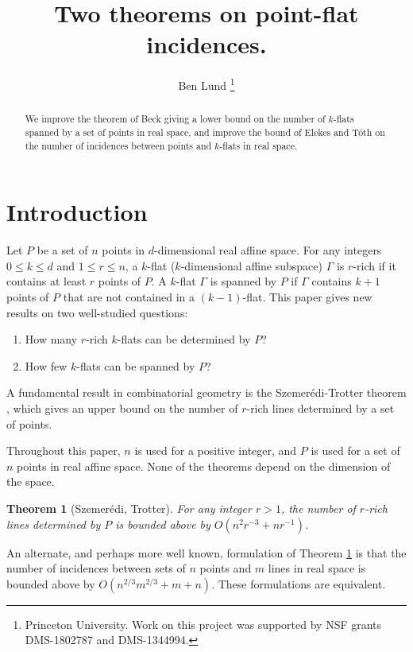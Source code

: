 \documentclass{article}
\newtheorem{theorem}{Theorem}
\begin{document}
\title{Two theorems on point-flat incidences.}
\author{Ben Lund \footnote{Princeton University. Work on this project was supported by NSF grants DMS-1802787 and DMS-1344994.}}

\maketitle

\begin{abstract}
We improve the theorem of Beck giving a lower bound on the number of $k$-flats spanned by a set of points in real space, and improve the bound of Elekes and T\'oth on the number of incidences between points and $k$-flats in real space.
\end{abstract}

\section{Introduction}

Let $P$ be a set of $n$ points in $d$-dimensional real affine space.
For any integers $0 \leq k \leq d$ and $1 \leq r \leq n$, a $k$-flat ($k$-dimensional affine subspace) $\Gamma$ is $r$-rich if it contains at least $r$ points of $P$.
A $k$-flat $\Gamma$ is spanned by $P$ if $\Gamma$ contains $k+1$ points of $P$ that are not contained in a $(k-1)$-flat.
This paper gives new results on two well-studied questions:
\begin{enumerate}
\item How many $r$-rich $k$-flats can be determined by $P$?
\item How few $k$-flats can be spanned by $P$?
\end{enumerate}

A fundamental result in combinatorial geometry is the Szemer\'edi-Trotter theorem \cite{szemeredi1983extremal}, which gives an upper bound on the number of $r$-rich lines determined by a set of points.

Throughout this paper, $n$ is used for a positive integer, and $P$ is used for a set of $n$ points in real affine space.
None of the theorems depend on the dimension of the space.

\begin{theorem}[Szemer\'edi, Trotter]\label{th:sz-t}
For any integer $r > 1$, the number of $r$-rich lines determined by $P$ is bounded above by $O(n^2 r^{-3} + n r^{-1})$.
\end{theorem}

An alternate, and perhaps more well known, formulation of Theorem \ref{th:sz-t} is that the number of incidences between sets of $n$ points and $m$ lines in real space is bounded above by $O(n^{2/3}m^{2/3} + m + n)$.
These formulations are equivalent.
\end{document}
